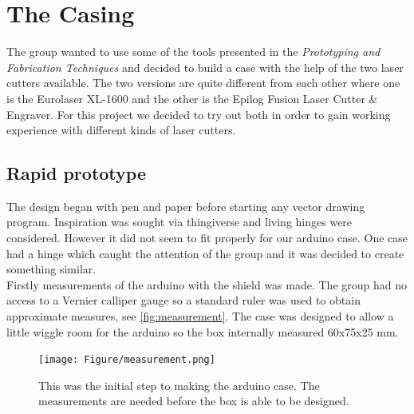 \chapter{The Casing}
\label{the_casing}
The group wanted to use some of the tools presented in the \textit{Prototyping and Fabrication Techniques} and decided to build a case with the help of the two laser cutters available. The two versions are quite different from each other where one is the Eurolaser XL-1600 and the other is the Epilog Fusion Laser Cutter \& Engraver. For this project we decided to try out both in order to gain working experience with different kinds of laser cutters. 

\section{Rapid prototype}
The design began with pen and paper before starting any vector drawing program. Inspiration was sought via thingiverse and living hinges were considered. However it did not seem to fit properly for our arduino case. One case had a hinge which caught the attention of the group and it was decided to create something similar.\\
Firstly measurements of the arduino with the shield was made. The group had no access to a Vernier calliper gauge so a standard ruler was used to obtain approximate measures, see \autoref{fig:measurement}. The case was designed to allow a little wiggle room for the arduino so the box internally measured 60x75x25 mm.
\begin{figure}
\centering
\texttt{[image: Figure/measurement.png]}
\caption{This was the initial step to making the arduino case. The measurements are needed before the box is able to be designed.}
\label{fig:measurement}
\end{figure}




